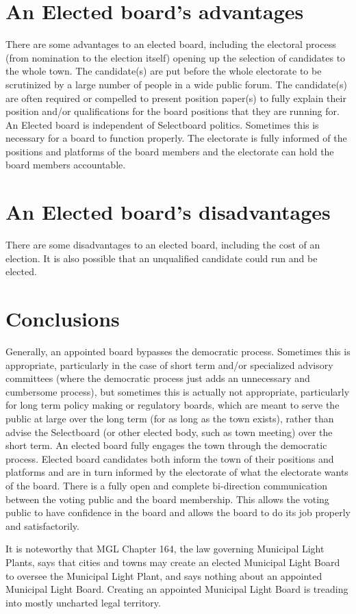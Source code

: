\documentclass[12pt]{article}
\begin{document}
\section{An Elected board's advantages}

There are some advantages to an elected board, including the electoral
process (from nomination to the election itself) opening up the selection of
candidates to the whole town. The candidate(s) are put before the whole
electorate to be scrutinized by a large number of people in a wide public
forum. The candidate(s) are often required or compelled to present position
paper(s) to fully explain their position and/or qualifications for the board
positions that they are running for. An Elected board is independent of
Selectboard politics. Sometimes this is necessary for a board to function
properly. The electorate is fully informed of the positions and platforms of
the board members and the electorate can hold the board members accountable.

\section{An Elected board's disadvantages}

There are some disadvantages to an  elected board, including the cost of an 
election. It is also possible that an unqualified candidate could run and be 
elected. 

\section{Conclusions}

Generally, an appointed board bypasses the democratic process. Sometimes this
is appropriate, particularly in the case of short term and/or specialized
advisory committees (where the democratic process just adds an unnecessary and
cumbersome process), but sometimes this is actually not appropriate,
particularly for long term policy making or regulatory boards, which are meant
to serve the public at large over the long term (for as long as the town
exists), rather than advise the Selectboard (or other elected body, such as
town meeting) over the short term. An elected board fully engages the town
through the democratic process. Elected board candidates both inform the town
of their positions and platforms and are in turn informed by the electorate of
what the electorate wants of the board. There is a fully open and complete
bi-direction communication between the voting public and the board membership.
This allows the voting public to have confidence in the board and allows the
board to do its job properly and satisfactorily.

It is noteworthy that MGL Chapter 164\cite{MGL164}, the law governing
Municipal Light Plants, says that cities and towns may create an elected
Municipal Light Board to oversee the Municipal Light Plant, and says nothing
about an appointed Municipal Light Board. Creating an appointed Municipal
Light Board is treading into mostly uncharted legal territory.

\clearpage
{}


\end{document}

